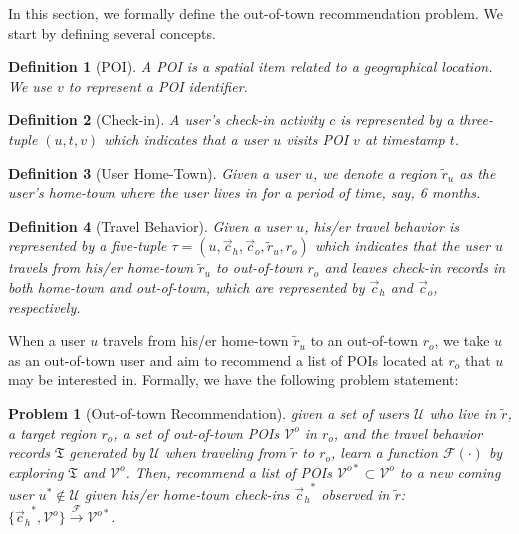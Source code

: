 \documentclass[letterpaper]{article} %
\newtheorem{defn}{Definition}
\newtheorem{prbl}{Problem}
\begin{document}
In this section, we formally define the out-of-town recommendation problem.
We start by defining several concepts.

\begin{defn}[POI]
A POI is a spatial item related to a geographical location.
We use $v$ to represent a POI identifier.
\end{defn}

\begin{defn}[Check-in]
A user's check-in activity $c$ is represented by a three-tuple $ (u, t, v) $ which indicates that a user $u$ visits POI $v$ at timestamp $t$.
\end{defn}

\begin{defn}[User Home-Town]
Given a user $u$, we denote a region $ \tilde{r}_u $ as the user's home-town where the user lives in for a period of time, say, 6 months.
\end{defn}

\begin{defn}[Travel Behavior]
Given a user $u$, his/er travel behavior is represented by a five-tuple $ \tau = (u, \vec{c}_{h}, \vec{c}_{ o}, \tilde{r}_u, r_o ) $ which indicates that the user $u$ travels from his/er home-town $ \tilde{r}_u $ to out-of-town $ r_o $ and leaves check-in records in both home-town and out-of-town, which are represented by $ \vec{c}_{ h} $ and $ \vec{c}_{ o} $, respectively.
\end{defn}


When a user $u$ travels from his/er home-town  $ \tilde{r}_u $ to an out-of-town $ r_o $, we take $u$ as an out-of-town user and aim to recommend a list of POIs located at $ r_o $ that $u$ may be interested in.
Formally, we have the following problem statement:

\begin{prbl}[Out-of-town Recommendation]
given a set of users $\mathcal{U}$ who live in $\tilde{r}$,
a target region $ r_o $,
a set of out-of-town POIs $\mathcal{V}^o$ in $r_o$,
and the travel behavior records $ \mathfrak{T} $ generated by $ \mathcal{U} $ when traveling from $\tilde{r}$ to $r_o$,
learn a function $ \mathcal{F}( \cdot ) $ by exploring $ \mathfrak{T} $ and $ \mathcal{V}^o $.
Then, recommend a list of POIs $\mathcal{V}^{o{\ast}} \subset \mathcal{V}^o $ to a new coming user $ u^{\ast} \notin \mathcal{U} $ given his/er home-town check-ins $ {\vec{c}_h}^{\ast} $ observed in  $\tilde{r}$:
$ \{ {\vec{c}_h}^{\ast}, \mathcal{V}^o \} \xrightarrow{ \mathcal{F} } \mathcal{V}^{o{\ast}}  $.
\end{prbl}
\end{document}
